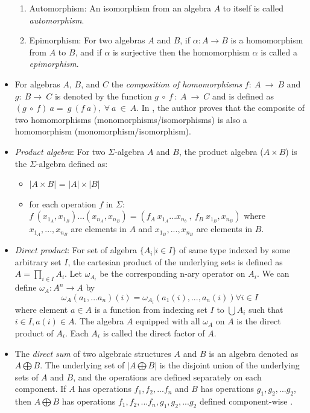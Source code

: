 \begin{itemize}
\begin{enumerate}
        \item Automorphism: An isomorphism from an algebra $A$ to itself is
        called \textit{automorphism}.

        \item Epimorphism: For two algebras $A$ and $B$, if \(\alpha : A
        \rightarrow B \) is a homomorphism from $A$ to $B$, and if \(\alpha\) is
        surjective then the homomorphism \(\alpha\) is called a
        \textit{epimorphism}.
    \end{enumerate}

    \item For algebras $A$, $B$, and $C$ the \textit{composition of
    homomorphisms} $f:\ A \ \rightarrow \ B$ and $g:\ B \rightarrow\ C$ is
    denoted by the function $g\ \circ \ f\ :\ A\ \rightarrow \ C$ and is defined
    as $(g\ \circ \ f)\ a = \ g\ (f\ a), \ \forall \ a\ \in\ A$. In
    \cite{sankappanavar1981course}, the author proves that the composite of two
    homomorphisms (monomorphisms/isomorphisms) is also a homomorphism
    (monomorphism/isomorphism).
    
    \item \textit{Product algebra}: For two $\Sigma$-algebra $A$ and $B$, the
    product algebra ($A \times B$) is the $\Sigma$-algebra defined as:
    \begin{itemize}
      \item $|A \times B|$ = $|A| \times |B|$ 
      \item for each operation $f$ in $\Sigma$: $f\
      (x_{1_A},x_{1_B})...(x_{n_A},x_{n_B}) = (f_A\ x_{1_A}...x_{n_b}\ ,\ f_B\
      x_{1_B},x_{n_B} )$ where $x_{1_A},...,x_{n_B}$ are elements in $A$ and
      $x_{1_B},...,x_{n_B}$ are elements in $B$. 
    \end{itemize}

    \item \textit{Direct product}: For set of algebra $\{ A_i | i \in I \}$ of
    same type indexed by some arbitrary set $I$, the cartesian product of the
    underlying sets is defined as $A = \displaystyle \prod_{i\in I} A_i$. Let
    $\omega_{A_i}$ be the corresponding n-ary operator on $A_i$. We can define
    $\omega_A : A^{n} \rightarrow A$ by \[ \omega_A(a_1,...a_n)(i) =
    \omega_{A_i} (a_1(i),...,a_n(i)) \forall i \in I\] where element $a \in A$
    is a function from indexing set $I$ to $\bigcup A_i$ such that $i \in I,
    a(i) \in A$. The algebra $A$ equipped with all $\omega_A$ on $A$ is the
    direct product of $A_i$. Each $A_i$ is called the direct factor of $A$. 

    \item The \textit{direct sum} of two algebraic structures $A$ and $B$ is an
    algebra denoted as $A \bigoplus B$. The underlying set of $|A \bigoplus B|$
    is the disjoint union of the underlying sets of $A$ and $B$, and the
    operations are defined separately on each component. If $A$ has operations
    $f_1, f_2, ... f_n$ and $B$ has operations $g_1,g_2, ... g_2$, then $A
    \bigoplus B$ has operations $f_1, f_2, ... f_n,g_1,g_2, ... g_2$ defined
    component-wise \cite{directproduct}. 
    

\end{itemize}